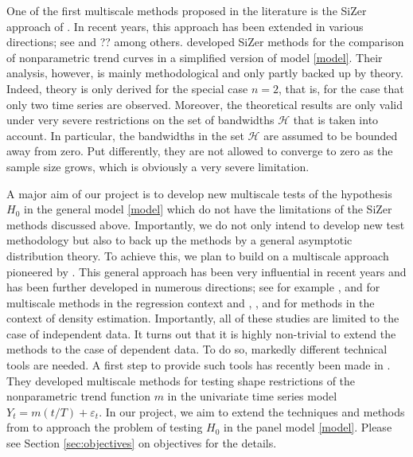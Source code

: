 \documentclass[a4paper,12pt]{article}
\begin{document}
One of the first multiscale methods proposed in the literature is the SiZer approach of \cite{ChaudhuriMarron1999, ChaudhuriMarron2000}. In recent years, this approach has been extended in various directions; see \cite{HannigMarron2006} and ?? among others. \cite{Park2009} developed SiZer methods for the comparison of nonparametric trend curves in a simplified version of model \eqref{model}. Their analysis, however, is mainly methodological and only partly backed up by theory. Indeed, theory is only derived for the special case $n=2$, that is, for the case that only two time series are observed. Moreover, the theoretical results are only valid under very severe restrictions on the set of bandwidths $\mathcal{H}$ that is taken into account. In particular, the bandwidths in the set $\mathcal{H}$ are assumed to be bounded away from zero. Put differently, they are not allowed to converge to zero as the sample size grows, which is obviously a very severe limitation. 


A major aim of our project is to develop new multiscale tests of the hypothesis $H_0$ in the general model \eqref{model} which do not have the limitations of the SiZer methods discussed above. Importantly, we do not only intend to develop new test methodology but also to back up the methods by a general asymptotic distribution theory. To achieve this, we plan to build on a multiscale approach pioneered by \cite{DuembgenSpokoiny2001}. This general approach has been very influential in recent years and has been further developed in numerous directions; see for example \cite{Duembgen2002}, \cite{Rohde2008} and \cite{ProkschWernerMunk2018} for multiscale methods in the regression context and \cite{DuembgenWalther2008}, \cite{RufibachWalther2010}, \cite{SchmidtHieber2013} and \cite{EckleBissantzDette2017} for methods in the context of density estimation. Importantly, all of these studies are limited to the case of independent data. It turns out that it is highly non-trivial to extend the methods to the case of dependent data. To do so, markedly different technical tools are needed. A first step to provide such tools has recently been made in \cite{KhismatullinaVogt2018}. They developed multiscale methods for testing shape restrictions of the nonparametric trend function $m$ in the univariate time series model $Y_t = m(t/T) + \varepsilon_t$. In our project, we aim to extend the techniques and methods from \cite{KhismatullinaVogt2018} to approach the problem of testing $H_0$ in the panel model \eqref{model}. Please see Section \ref{sec:objectives} on objectives for the details. 
\vspace{15pt}
\end{document}
